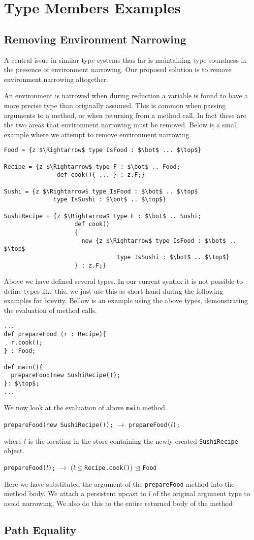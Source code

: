 \documentclass{llncs}
\numberwithin{subcase}{case}
\numberwithin{case}{theorem}
\numberwithin{case}{lemma}
\begin{document}
\section{Type Members Examples}

\subsection{Removing Environment Narrowing}

A central issue in similar type systems thus far is maintaining 
type soundness in the presence of environment narrowing. Our 
proposed solution is to remove environment narrowing altogether.

An environment is narrowed when during reduction a variable is 
found to have a more precise type than originally assumed. This 
is common when passing arguments to a method, or when returning 
from a method call. In fact these are the two areas that environment 
narrowing must be removed. Below is a small example where we attempt to 
remove environment narrowing.
\begin{lstlisting}[mathescape, style=custom_lang]
Food = {z $\Rightarrow$ type IsFood : $\bot$ ... $\top$}

Recipe = {z $\Rightarrow$ type F : $\bot$ .. Food;
               def cook(){ ... } : z.F;}
               
Sushi = {z $\Rightarrow$ type IsFood : $\bot$ .. $\top$
              type IsSushi : $\bot$ .. $\top$}

SushiRecipe = {z $\Rightarrow$ type F : $\bot$ .. Sushi;
                    def cook()
                    {
                      new {z $\Rightarrow$ type IsFood : $\bot$ .. $\top$
                                type IsSushi : $\bot$ .. $\top$}
                    } : z.F;}
\end{lstlisting}
Above we have defined several types. In our current syntax 
it is not possible to define types like this, we just use this 
as short hand during the following examples for brevity. Bellow 
is an example using the above types, demonstrating the evaluation 
of method calls.
\begin{lstlisting}[mathescape, style=custom_lang]
...
def prepareFood (r : Recipe){
  r.cook();
} : Food;

def main(){
  prepareFood(new SushiRecipe());
}: $\top$;
...
\end{lstlisting}
We now look at the evaluation of above \texttt{main} method.
\begin{center}
\texttt{prepareFood(new SushiRecipe());} $\rightarrow$ \texttt{prepareFood($l$);}
\end{center}
where $l$ is the location in 
the store containing the newly created \texttt{SushiRecipe} object.
\begin{center}
\texttt{prepareFood($l$);} $\rightarrow$ ($l\unlhd$\texttt{Recipe.cook()}) 
$\unlhd$ \texttt{Food}
\end{center}
Here we have substituted the argument of the \texttt{prepareFood} method 
into the method body. We attach a persistent upcast to $l$ of the original 
argument type to avoid narrowing. We also do this to the entire returned body 
of the method
\subsection{Path Equality}



\end{document}
